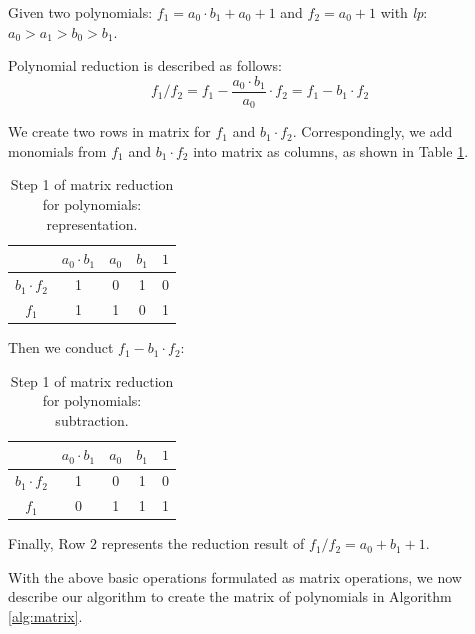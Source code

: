 \begin{Example}\label{exp:division}
	 Given two polynomials: $f_{1}=a_{0}\cdot b_{1}+a_{0}+1$ 
	 and $f_{2}=a_{0}+1$ with {\it lp}: $a_{0}>a_{1}>b_{0}>b_{1}$.
	 
	 Polynomial reduction is described as follows:
	\begin{equation}
		{f_1}/{f_2}=f_{1}-\frac{a_{0}\cdot b_{1}}{a_{0}}\cdot f_{2} =f_{1}-b_{1}\cdot f_{2} \nonumber
	\end{equation}
	 
	 We create two rows in matrix for $f_{1}$ and $b_{1}\cdot f_{2}$. 
	 Correspondingly, we add monomials from $f_{1}$ and $b_{1}\cdot f_{2}$ into matrix as columns, as shown in Table \ref{tab:red}.
	 
	\begin{table}[htb]
	\begin{center}
	\caption{ Step 1 of matrix reduction for polynomials: representation.}
	\label{tab:red}
	\begin{tabular}{|c|c|c|c|c|} \hline 
			&$a_{0} \cdot b_{1}$ & $a_{0}$ & $b_{1}$ & $1$  \\
	\hline 
	$b_{1}\cdot f_{2}$ & 1 &0 & 1  & 0 \\ 
	\hline
	$f_{1}$ & 1 &1 & 0 & 1  \\
	\hline
	\end{tabular}
	\end{center}
	\end{table}
	
	Then we conduct $f_{1}-b_{1}\cdot f_{2}$:
	
	\begin{table}[htb]
	\begin{center}
	\caption{Step 1 of matrix reduction for polynomials: subtraction.}
	\label{tab:red2}
	\begin{tabular}{|c|c|c|c|c|} \hline 
			&$a_{0} \cdot b_{1}$ & $a_{0}$ & $b_{1}$ & $1$  \\
	\hline 
	$b_{1}\cdot f_{2}$ & 1 &0 & 1  & 0 \\ 
	\hline
	$f_{1}$ & 0 &1 & 1 & 1  \\
	\hline
	\end{tabular}
	\end{center}
	\end{table}
	
	Finally, Row $2$ represents the reduction result of ${f_1}/{f_2}=a_{0}+b_{1}+1$.
	
 \end{Example}

With the above basic operations formulated as matrix operations, 
we now describe our algorithm to create the matrix of polynomials in Algorithm \ref{alg:matrix}.


